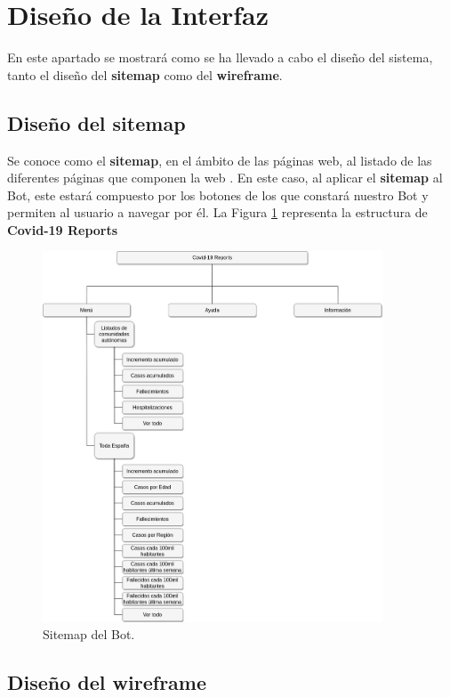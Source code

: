 \section{Diseño de la Interfaz}

En este apartado se mostrará como se ha llevado a cabo el diseño del sistema, tanto el diseño del \textbf{sitemap} como del \textbf{wireframe}.

\subsection{Diseño del sitemap}

Se conoce como el \textbf{sitemap}, en el ámbito de las páginas web, al listado de las diferentes páginas que componen la web \cite{articulo-sitemap}. En este caso, al aplicar el \textbf{sitemap} al Bot, este estará compuesto por los botones de los que constará nuestro Bot y permiten al usuario a navegar por él. La Figura \ref{fig:sitemap} representa la estructura de \textbf{Covid-19 Reports}

\begin{figure}[H]
	\centering
	\includegraphics[width=0.9\textwidth]{img/sitemap}
	\caption{Sitemap del Bot.}
	\label{fig:sitemap}
\end{figure}

\subsection{Diseño del wireframe}

